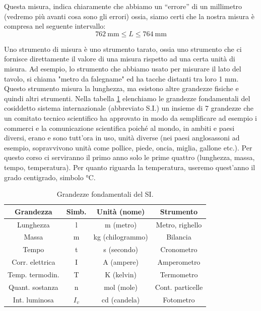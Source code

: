 \documentclass[12pt,a4paper,oneside]{book}
\theoremstyle{esercizio}
\begin{document}
Questa misura, indica chiaramente che abbiamo un ``errore'' di un millimetro (vedremo più avanti cosa sono gli errori) ossia, siamo certi che la nostra misura è compresa nel seguente intervallo:
\[
\SI{762}{\milli\meter} \le L \le \SI{764}{\milli\meter}
\]


Uno strumento di misura è uno strumento tarato, ossia uno strumento che ci fornisce direttamente  il valore di  una misura rispetto ad una certa unità di misura. Ad esempio, lo strumento che abbiamo usato per misurare il lato del tavolo, si chiama "metro da falegname" ed ha tacche distanti tra loro 1 mm. Questo strumento misura la lunghezza, ma esistono altre grandezze fisiche e quindi altri strumenti. Nella tabella \ref{tab:si_units} elenchiamo le grandezze fondamentali del cosiddetto sistema internazionale (abbreviato S.I.) un insieme di 7 grandezze che un comitato tecnico scientifico ha approvato in modo da semplificare ad esempio i commerci e la comunicazione scientifica poiché al mondo, in ambiti e paesi diversi, erano e sono tutt'ora in uso, unità diverse (nei paesi anglosassoni ad esempio, sopravvivono unità come pollice, piede, oncia, miglia, gallone etc.). Per questo corso ci serviranno il primo anno solo le prime quattro (lunghezza, massa, tempo, temperatura). Per quanto riguarda la temperatura, useremo quest'anno il grado centigrado, simbolo °C. 

\begin{table}[h!]
	\centering
	\begin{tabular}{|c|c|c|c|}
		\hline
		\textbf{Grandezza} & \textbf{Simb.} & \textbf{Unità (nome)} & \textbf{Strumento} \\
		\hline
		Lunghezza & l & m (metro) & Metro, righello \\
		\hline
		Massa & m & kg (chilogrammo) & Bilancia \\
		\hline
		Tempo & t & s (secondo) & Cronometro \\
		\hline
		Corr. elettrica & I & A (ampere) & Amperometro \\
		\hline
		Temp. termodin. & T & K (kelvin) & Termometro \\
		\hline
		Quant. sostanza & n & mol (mole) & Cont. particelle \\
		\hline
		Int. luminosa & $I_v$ & cd (candela) & Fotometro \\
		\hline
	\end{tabular}
	\caption{Grandezze fondamentali del SI.}
	\label{tab:si_units}
\end{table}
\end{document}
